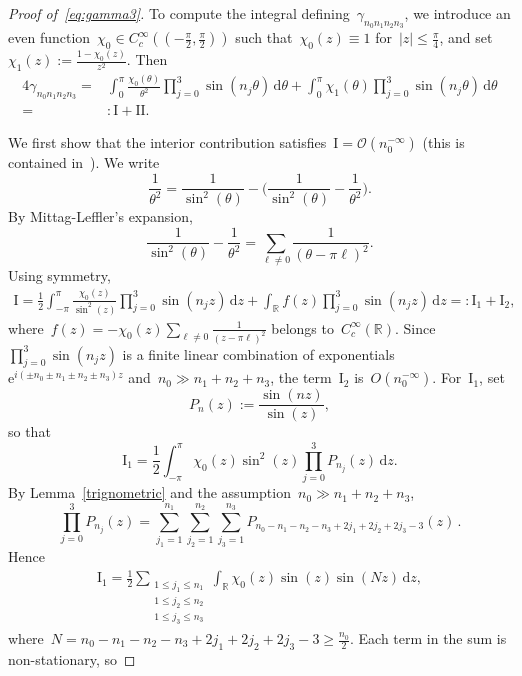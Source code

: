 \documentclass[11pt,reqno,english]{amsart}
\numberwithin{equation}{section}
\theoremstyle{plain}
\theoremstyle{definition}
\theoremstyle{remark}
\newcommand{\R}{\mathbb{R}}
\newcommand{\e}{\mathrm{e}}
\begin{document}
\begin{proof}[Proof of~\eqref{eq:gamma3}]
	To compute the integral defining~$\gamma_{n_0n_1n_2n_3}$, we introduce an even function~$\chi_0\in C_c^{\infty}((-\frac{\pi}{2},\frac{\pi}{2}))$ such that~$\chi_0(z)\equiv 1$ for~$|z|\leq \frac{\pi}{4}$, and set~$\chi_1(z):=\frac{1-\chi_0(z)}{z^2}$. Then
	\begin{align*}
		4\gamma_{n_0n_1n_2n_3}=
		&\int_0^\pi \frac{\chi_0(\theta)}{\theta^2}\prod_{j=0}^3\sin(n_j \theta)\,\mathrm{d}\theta+\int_0^\pi \chi_1(\theta)\prod_{j=0}^3 \sin(n_j \theta) \,\mathrm{d}\theta\\
		=&:\mathrm{I}+\mathrm{II}.
	\end{align*}

	We first show that the interior contribution satisfies~$\mathrm{I} = \mathcal{O}(n_0^{-\infty})$ (this is contained in~\cite[Lemma~2.6]{BGT05}).
	We write
	\[
	\frac{1}{\theta^2}=\frac{1}{\sin^2(\theta)}-\Big(\frac{1}{\sin^2(\theta)}-\frac{1}{\theta^2}\Big).
	\]
	By Mittag-Leffler's expansion,
	\[
	\frac{1}{\sin^2(\theta)}-\frac{1}{\theta^2}=\sum_{\ell \neq 0}\frac{1}{(\theta-\pi\ell)^2}.
	\]
	Using symmetry,
	\begin{align*}
		\mathrm{I}=\frac{1}{2}\int_{-\pi}^{\pi} \frac{\chi_0(z)}{\sin^2(z)}\prod_{j=0}^3 \sin(n_jz)\, \mathrm{d}z +\int_{\R}f(z)\prod_{j=0}^3\sin(n_jz)\, \mathrm{d}z=:\mathrm{I}_1+\mathrm{I}_2,
	\end{align*}
	where~$f(z)=-\chi_0(z)\sum_{\ell\neq 0}\frac{1}{(z-\pi\ell)^2}$ belongs to~$C_c^{\infty}(\R)$. Since~$\prod_{j=0}^3\sin(n_jz)$ is a finite linear combination of exponentials~$\e^{i(\pm n_0\pm n_1\pm n_2\pm n_3)z}$ and~$n_0\gg n_1+n_2+n_3$, the term~$\mathrm{I}_2$ is~$O(n_0^{-\infty})$. For~$\mathrm{I}_1$, set
	\[
	P_n(z):=\frac{\sin(nz)}{\sin(z)},
	\]
	so that
	\[
	\mathrm{I}_1=\frac{1}{2}\int_{-\pi}^{\pi}\chi_0(z)\sin^2(z)\prod_{j=0}^3 P_{n_j}(z)\, \mathrm{d}z.
	\]
	By Lemma~\ref{trignometric} and the assumption~$n_0\gg n_1+n_2+n_3$,
	\[
	\prod_{j=0}^3 P_{n_j}(z)=\sum_{j_1=1}^{n_1}\sum_{j_2=1}^{n_2}\sum_{j_3=1}^{n_3}P_{n_0-n_1-n_2-n_3+2j_1+2j_2+2j_3-3}(z)\,.
	\]
	Hence
	\begin{align*}
		\mathrm{I}_1=\frac{1}{2}\sum_{\substack{1\leq j_1\leq n_1\\
				1\leq j_2\leq n_2\\
				1\leq j_3\leq n_3}}\int_{\R}\chi_0(z)\sin(z) \sin(Nz) \,\mathrm{d}z,
	\end{align*}
	where~$N=n_0-n_1-n_2-n_3+2j_1+2j_2+2j_3-3 \geq \frac{n_0}{2}$. Each term in the sum is non-stationary, so

\end{proof}
\end{document}
